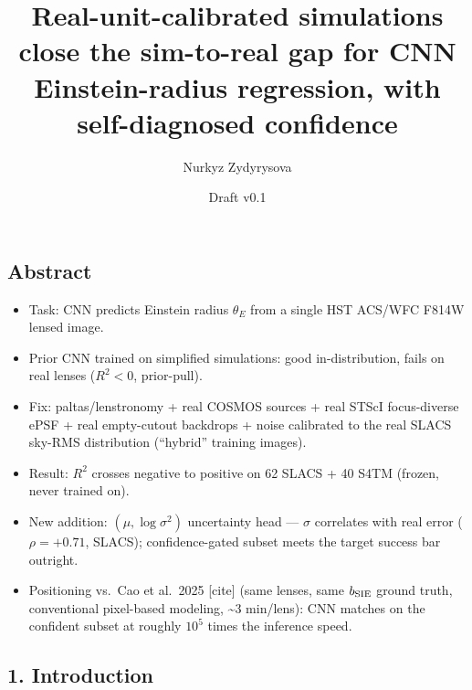 \documentclass[
  11pt,
]{article}
\title{Real-unit-calibrated simulations close the sim-to-real gap for
CNN Einstein-radius regression, with self-diagnosed confidence}
\author{Nurkyz Zydyrysova}
\date{Draft v0.1}
\providecommand{\tightlist}{%
  \setlength{\itemsep}{0pt}\setlength{\parskip}{0pt}}
\begin{document}
\maketitle

\hypertarget{abstract}{%
\subsection{Abstract}\label{abstract}}

\begin{itemize}
\tightlist
\item
  Task: CNN predicts Einstein radius \(\theta_E\) from a single HST
  ACS/WFC F814W lensed image.
\item
  Prior CNN trained on simplified simulations: good in-distribution,
  fails on real lenses (\(R^2 < 0\), prior-pull).
\item
  Fix: paltas/lenstronomy + real COSMOS sources + real STScI
  focus-diverse ePSF + real empty-cutout backdrops + noise calibrated to
  the real SLACS sky-RMS distribution (``hybrid'' training images).
\item
  Result: \(R^2\) crosses negative to positive on 62 SLACS + 40 S4TM
  (frozen, never trained on).
\item
  New addition: \((\mu, \log\sigma^2)\) uncertainty head --- \(\sigma\)
  correlates with real error (\(\rho = +0.71\), SLACS); confidence-gated
  subset meets the target success bar outright.
\item
  Positioning vs.~Cao et al.~2025 {[}cite{]} (same lenses, same
  \(b_{\rm SIE}\) ground truth, conventional pixel-based modeling,
  \textasciitilde3 min/lens): CNN matches on the confident subset at
  roughly \(10^5\) times the inference speed.
\end{itemize}

\hypertarget{introduction}{%
\subsection{1. Introduction}\label{introduction}}
\end{document}
